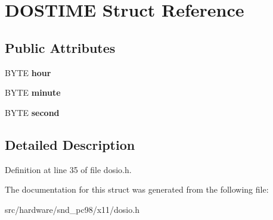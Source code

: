 \hypertarget{structDOSTIME}{\section{D\-O\-S\-T\-I\-M\-E Struct Reference}
\label{structDOSTIME}
}
\subsection*{Public Attributes}
\begin{DoxyCompactItemize}
\item 
\hypertarget{structDOSTIME_a9e1a723f3cb3c5349749f57f2ad1d297}{B\-Y\-T\-E {\bfseries hour}}\label{structDOSTIME_a9e1a723f3cb3c5349749f57f2ad1d297}

\item 
\hypertarget{structDOSTIME_a38886c32b3d5ea6c68ced9c28260ad89}{B\-Y\-T\-E {\bfseries minute}}\label{structDOSTIME_a38886c32b3d5ea6c68ced9c28260ad89}

\item 
\hypertarget{structDOSTIME_a21edb7a5a719279c22fd125f3aff6b91}{B\-Y\-T\-E {\bfseries second}}\label{structDOSTIME_a21edb7a5a719279c22fd125f3aff6b91}

\end{DoxyCompactItemize}


\subsection{Detailed Description}


Definition at line 35 of file dosio.\-h.



The documentation for this struct was generated from the following file\-:\begin{DoxyCompactItemize}
\item 
src/hardware/snd\-\_\-pc98/x11/dosio.\-h\end{DoxyCompactItemize}
